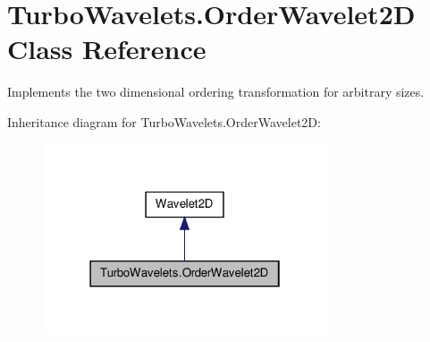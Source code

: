 \hypertarget{class_turbo_wavelets_1_1_order_wavelet2_d}{\section{\-Turbo\-Wavelets.\-Order\-Wavelet2\-D \-Class \-Reference}
\label{class_turbo_wavelets_1_1_order_wavelet2_d}
}


\-Implements the two dimensional ordering transformation for arbitrary sizes.  




\-Inheritance diagram for \-Turbo\-Wavelets.\-Order\-Wavelet2\-D\-:
\nopagebreak
\begin{figure}[H]
\begin{center}
\leavevmode
\includegraphics[width=238pt]{class_turbo_wavelets_1_1_order_wavelet2_d__inherit__graph}
\end{center}
\end{figure}
